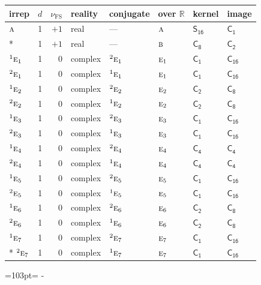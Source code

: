 \documentclass[10pt,a4paper]{article}
\newcommand{\needspace}[1]{\par\penalty-100\begingroup\dimen0=#1\relax\dimen2=\pagegoal
  \advance\dimen2-\pagetotal\ifdim\dimen0>\dimen2\relax\ifdim\dimen2>0pt\vfil\break\fi\fi
  \endgroup}
\numberwithin{equation}{section}
\newcommand{\grp}[1]{\mathsf{#1}}
\newcommand{\irr}[1]{\text{\normalfont\scshape #1}}
\newcommand{\conjpair}[1]{{}^{#1}}
\newcommand{\detbox}[1]{{\setlength{\fboxsep}{1pt}\fbox{#1}}}
\newcommand{\fsind}{\nu_{\mathrm{FS}}}
\begin{document}
{\small\renewcommand{\arraystretch}{1.25}\setlength{\tabcolsep}{4pt}\begin{longtable}{@{}lrrlllll@{}}\toprule
irrep & $d$ & $\fsind$ & reality & conjugate & over $\mathbb{R}$ & kernel & image\\\midrule\endhead
\bottomrule\endfoot\endlastfoot
$\irr{a}$ & 1 & $+1$ & real & --- & $\irr{a}$ & \href{S16.pdf}{$\grp{S_{16}}$} & \href{C1.pdf}{$\grp{C_{1}}$}\\*
\detbox{$\irr{b}$} & 1 & $+1$ & real & --- & $\irr{b}$ & \href{C8.pdf}{$\grp{C_{8}}$} & \href{C2.pdf}{$\grp{C_{2}}$}\\
$\conjpair{1}\irr{e}_{1}$ & 1 & $0$ & complex & $\conjpair{2}\irr{e}_{1}$ & $\irr{e}_{1}$ & \href{C1.pdf}{$\grp{C_{1}}$} & $\grp{C_{16}}$\\
$\conjpair{2}\irr{e}_{1}$ & 1 & $0$ & complex & $\conjpair{1}\irr{e}_{1}$ & $\irr{e}_{1}$ & \href{C1.pdf}{$\grp{C_{1}}$} & $\grp{C_{16}}$\\
$\conjpair{1}\irr{e}_{2}$ & 1 & $0$ & complex & $\conjpair{2}\irr{e}_{2}$ & $\irr{e}_{2}$ & \href{C2.pdf}{$\grp{C_{2}}$} & \href{C8.pdf}{$\grp{C_{8}}$}\\
$\conjpair{2}\irr{e}_{2}$ & 1 & $0$ & complex & $\conjpair{1}\irr{e}_{2}$ & $\irr{e}_{2}$ & \href{C2.pdf}{$\grp{C_{2}}$} & \href{C8.pdf}{$\grp{C_{8}}$}\\
$\conjpair{1}\irr{e}_{3}$ & 1 & $0$ & complex & $\conjpair{2}\irr{e}_{3}$ & $\irr{e}_{3}$ & \href{C1.pdf}{$\grp{C_{1}}$} & $\grp{C_{16}}$\\
$\conjpair{2}\irr{e}_{3}$ & 1 & $0$ & complex & $\conjpair{1}\irr{e}_{3}$ & $\irr{e}_{3}$ & \href{C1.pdf}{$\grp{C_{1}}$} & $\grp{C_{16}}$\\
$\conjpair{1}\irr{e}_{4}$ & 1 & $0$ & complex & $\conjpair{2}\irr{e}_{4}$ & $\irr{e}_{4}$ & \href{C4.pdf}{$\grp{C_{4}}$} & \href{C4.pdf}{$\grp{C_{4}}$}\\
$\conjpair{2}\irr{e}_{4}$ & 1 & $0$ & complex & $\conjpair{1}\irr{e}_{4}$ & $\irr{e}_{4}$ & \href{C4.pdf}{$\grp{C_{4}}$} & \href{C4.pdf}{$\grp{C_{4}}$}\\
$\conjpair{1}\irr{e}_{5}$ & 1 & $0$ & complex & $\conjpair{2}\irr{e}_{5}$ & $\irr{e}_{5}$ & \href{C1.pdf}{$\grp{C_{1}}$} & $\grp{C_{16}}$\\
$\conjpair{2}\irr{e}_{5}$ & 1 & $0$ & complex & $\conjpair{1}\irr{e}_{5}$ & $\irr{e}_{5}$ & \href{C1.pdf}{$\grp{C_{1}}$} & $\grp{C_{16}}$\\
$\conjpair{1}\irr{e}_{6}$ & 1 & $0$ & complex & $\conjpair{2}\irr{e}_{6}$ & $\irr{e}_{6}$ & \href{C2.pdf}{$\grp{C_{2}}$} & \href{C8.pdf}{$\grp{C_{8}}$}\\
$\conjpair{2}\irr{e}_{6}$ & 1 & $0$ & complex & $\conjpair{1}\irr{e}_{6}$ & $\irr{e}_{6}$ & \href{C2.pdf}{$\grp{C_{2}}$} & \href{C8.pdf}{$\grp{C_{8}}$}\\
$\conjpair{1}\irr{e}_{7}$ & 1 & $0$ & complex & $\conjpair{2}\irr{e}_{7}$ & $\irr{e}_{7}$ & \href{C1.pdf}{$\grp{C_{1}}$} & $\grp{C_{16}}$\\*
$\conjpair{2}\irr{e}_{7}$ & 1 & $0$ & complex & $\conjpair{1}\irr{e}_{7}$ & $\irr{e}_{7}$ & \href{C1.pdf}{$\grp{C_{1}}$} & $\grp{C_{16}}$\\
\bottomrule\end{longtable}}
\needspace{103pt}
\end{document}
